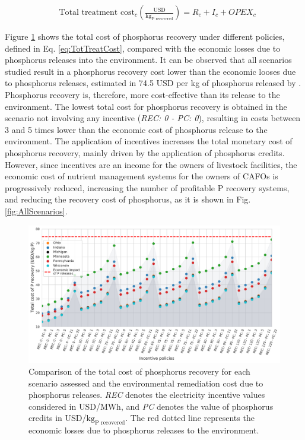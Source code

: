\begin{refsection}[referencesCh5]
\begin{align}
& \text{Total treatment cost}_{c} \left(\frac{\text{USD}}{\text{kg}_{\text{P recovered}}}\right) = R_{c} + I_{c} + OPEX_{c} \label{eq:TotTreatCost}
\end{align}

Figure \ref{fig:plot_scenarios} shows the total cost of phosphorus recovery under different policies, defined in Eq. \ref{eq:TotTreatCost}, compared with the economic losses due to phosphorus releases into the environment. It can be observed that all scenarios studied result in a phosphorus recovery cost lower than the economic looses due to phosphorus releases, estimated in 74.5 USD per kg of phosphorus released by \citet{Sampat2020}. Phosphorus recovery is, therefore, more cost-effective than its release to the environment. The lowest total cost for phosphorus recovery is obtained in the scenario not involving any incentive (\textit{REC: 0 - PC: 0}), resulting in costs between 3 and 5 times lower than the economic cost of phosphorus release to the environment. The application of incentives increases the total monetary cost of phosphorus recovery, mainly driven by the application of phosphorus credits. However, since incentives are an income for the owners of livestock facilities, the economic cost of nutrient management systems for the owners of CAFOs is progressively reduced, increasing the number of profitable P recovery systems, and reducing the recovery cost of phosphorus, as it is shown in Fig. \ref{fig:AllScenarios}.

\begin{figure}[h!]
	\centering
	\includegraphics[width=\linewidth]{gfx/Chapter5/TotalCost_kgPRecoveredAllStatesv2.pdf} 
	
	\caption{Comparison of the total cost of phosphorus recovery for each scenario assessed and the environmental remediation cost due to phosphorus releases. \textit{REC} denotes the electricity incentive values considered in USD/MWh, and \textit{PC} denotes the value of phosphorus credits in USD/${\text{kg}_\text{P recovered}}$. The red dotted line represents the economic losses due to phosphorus releases to the environment.}
	\label{fig:plot_scenarios}
\end{figure}


\end{refsection}
